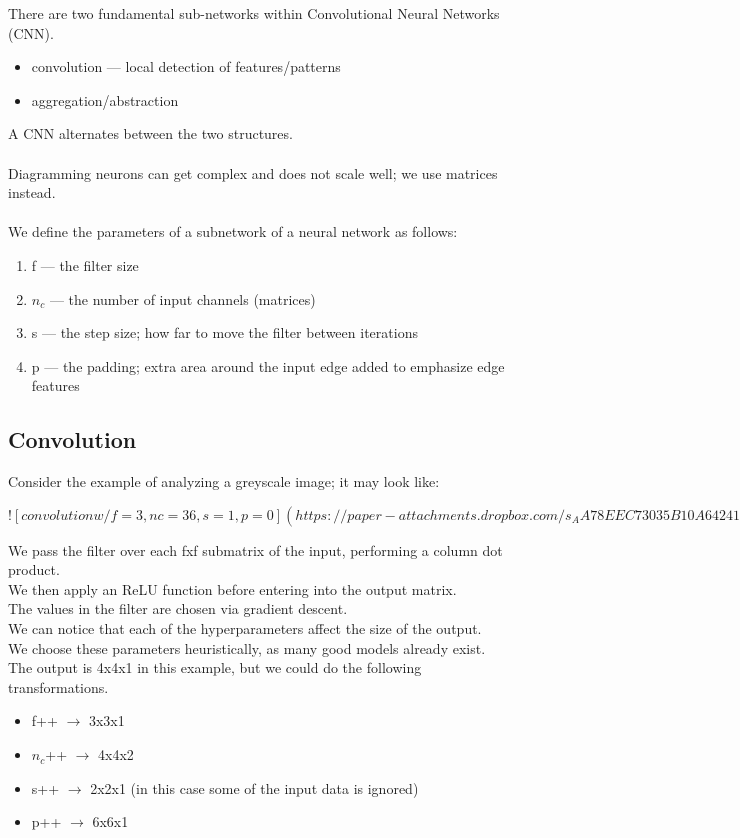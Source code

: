 \documentclass[../../lecture_notes.tex]{subfiles}
\begin{document}
\noindent There are two fundamental sub-networks within Convolutional Neural Networks (CNN).
\begin{itemize} [itemsep=0mm]
	\item convolution — local detection of features/patterns
	\item aggregation/abstraction
\end{itemize}
\noindent A CNN alternates between the two structures.\\
\\
Diagramming neurons can get complex and does not scale well; we use matrices instead.\\
\\
We define the parameters of a subnetwork of a neural network as follows:
\begin{enumerate} [itemsep=0mm]
	\item f — the filter size 
	\item $n_c$ — the number of input channels (matrices)
	\item s — the step size; how far to move the filter between iterations
	\item p — the padding; extra area around the input edge added to emphasize edge features
\end{enumerate}

\subsection*{Convolution}
\noindent Consider the example of analyzing a greyscale image; it may look like:

\newpage
$![convolution w/ f = 3, nc = 36, s = 1, p = 0](https://paper-attachments.dropbox.com/s_AA78EEC73035B10A6424111F8CC18FF4AA14B9B2A8F73FF013C6765837E92F61_1591303343711_Untitled+drawing+1.jpg)$
\newpage

\noindent We pass the filter over each fxf submatrix of the input, performing a column dot product.\\
We then apply an ReLU function before entering into the output matrix.\\
The values in the filter are chosen via gradient descent.\\
We can notice that each of the hyperparameters affect the size of the output.\\
We choose these parameters heuristically, as many good models already exist.\\
The output is 4x4x1 in this example, but we could do the following transformations.
\begin{itemize} [itemsep=0mm]
	\item f++ $\to$ 3x3x1
	\item $n_c$++ $\to$ 4x4x2
	\item s++ $\to$ 2x2x1 (in this case some of the input data is ignored)
	\item p++ $\to$ 6x6x1
\end{itemize}\medskip
\end{document}
